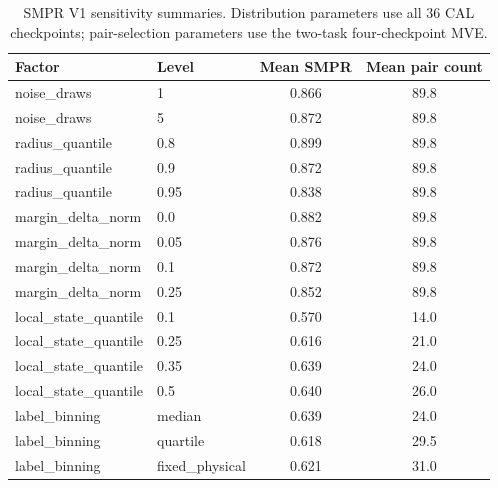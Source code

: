 \begin{table}[H]
\centering
\caption{SMPR V1 sensitivity summaries. Distribution parameters use all 36 CAL checkpoints; pair-selection parameters use the two-task four-checkpoint MVE.}
\label{tab:smpr-sensitivity}
\begin{tabular}{llcc}
\toprule
Factor & Level & Mean SMPR & Mean pair count \\
\midrule
noise\_draws & 1 & 0.866 & 89.8 \\
noise\_draws & 5 & 0.872 & 89.8 \\
radius\_quantile & 0.8 & 0.899 & 89.8 \\
radius\_quantile & 0.9 & 0.872 & 89.8 \\
radius\_quantile & 0.95 & 0.838 & 89.8 \\
margin\_delta\_norm & 0.0 & 0.882 & 89.8 \\
margin\_delta\_norm & 0.05 & 0.876 & 89.8 \\
margin\_delta\_norm & 0.1 & 0.872 & 89.8 \\
margin\_delta\_norm & 0.25 & 0.852 & 89.8 \\
local\_state\_quantile & 0.1 & 0.570 & 14.0 \\
local\_state\_quantile & 0.25 & 0.616 & 21.0 \\
local\_state\_quantile & 0.35 & 0.639 & 24.0 \\
local\_state\_quantile & 0.5 & 0.640 & 26.0 \\
label\_binning & median & 0.639 & 24.0 \\
label\_binning & quartile & 0.618 & 29.5 \\
label\_binning & fixed\_physical & 0.621 & 31.0 \\
\bottomrule
\end{tabular}
\end{table}
